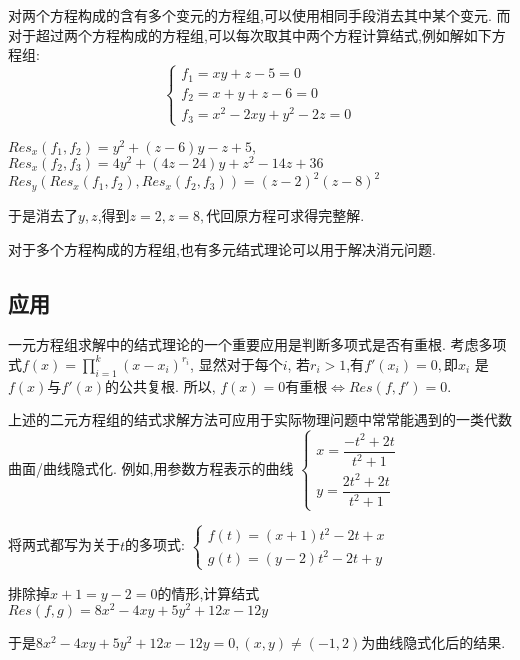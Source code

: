 	对两个方程构成的含有多个变元的方程组,可以使用相同手段消去其中某个变元.
	而对于超过两个方程构成的方程组,可以每次取其中两个方程计算结式,例如解如下方程组:
	\[  \begin{cases} f_1 = xy+z-5 = 0\\ f_2 = x+y+z-6 = 0 \\ f_3 = x^2-2xy+y^2-2z = 0
	\end{cases}\]

	$ Res_x(f_1,f_2) = y^2+(z-6)y-z+5, $ \\
	$Res_x(f_2,f_3)=4y^2+(4z-24)y + z^2-14z+36$\\
	$ Res_y(Res_x(f_1,f_2),Res_x(f_2,f_3)) = (z-2)^2(z-8)^2$

	于是消去了$ y,z$,得到$ z=2,z=8,$代回原方程可求得完整解.

	对于多个方程构成的方程组,也有多元结式理论可以用于解决消元问题.\cite{ideals}

\subsection{应用}
	一元方程组求解中的结式理论的一个重要应用是判断多项式是否有重根.
	考虑多项式$ f(x) = \prod_{i=1}^{k}{(x-x_i)^{r_i}}$,
	显然对于每个$ i$, 若$ r_i >1$,有$ f'(x_i) = 0,$即$ x_i $ 是$f(x)$与$ f'(x)$的公共复根.
	所以, $ f(x)=0$有重根$ \Leftrightarrow Res(f,f')=0$.

	上述的二元方程组的结式求解方法可应用于实际物理问题中常常能遇到的一类代数曲面/曲线隐式化.
	例如,用参数方程表示的曲线
	$ \begin{cases}x=\dfrac{-t^2+2t}{t^2+1} \\ y=\dfrac{2t^2+2t}{t^2+1} \end{cases}$

	将两式都写为关于$ t$的多项式: 
	$\begin{cases}f(t)=(x+1)t^2 -2t +x\\ g(t)=(y-2)t^2-2t+y \end{cases}$

	排除掉$ x+1=y-2=0$的情形,计算结式$ Res(f,g)= 8x^2-4xy+5y^2+12x-12y$ 
	
	于是$8x^2-4xy+5y^2+12x-12y=0,(x,y) \ne (-1,2)$为曲线隐式化后的结果.
